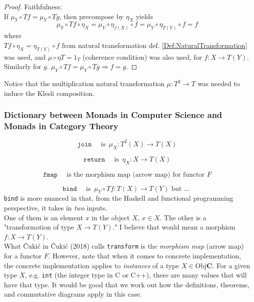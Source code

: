 \documentclass[10pt]{amsart}
\begin{document}
\begin{multicols*}{2}
\begin{proof}
Faithfulness: \\

If $\mu_Y \circ Tf = \mu_Y \circ Tg$, then precompose by $\eta_X$ yields 
\[
\mu_Y \circ Tf \circ \eta_X = \mu_Y \circ  \eta_{f(X)} \circ f = \mu_Y \circ \eta_{T(Y)} \circ f = f
\]
where \\
$Tf\circ \eta_X = \eta_{T(Y)} \circ f$ from natural transformation def. \ref{Def:NaturalTransformation} was used, and $\mu \circ \eta T = 1_T$ (coherence condition) was also used, for $f:X \to T(Y)$. \\

Similarly for $g$. $\mu_Y \circ Tf = \mu_Y \circ Tg \Longrightarrow f=g$.
\end{proof} 

Notice that the multiplication natural transformation $\mu:T^2 \to T$ was needed to induce the Klesli composition.

\subsubsection{Dictionary between Monads in Computer Science and Monads in Category Theory}

\[
\boxed{ \texttt{join} \quad \text{ is } \, \mu_X : T^2(X) \to T(X)}
\]

\[
\boxed{ \texttt{return} \quad \text{ is } \, \eta_X: X \to T(X) }
\]

\[
\boxed{ \texttt{fmap} \quad \text{ is the morphism map (arrow map) for functor } F}
\]

\[
\boxed{ \texttt{bind} \quad \text{ is } \, \mu_Y \circ Tf : T(X) \to T(Y) \text{ but ... }}
\]
\texttt{bind} is more nuanced in that, from the Haskell and functional programming perspective, it takes in \emph{two} inputs. \\

One of them is an element $x$ in the object $X$, $x \in X$. The other is a "transformation of type $X \to T(Y)$." I believe that would mean a morphism $f: X \to T(Y)$.  \\

What \v{C}uki\'{c} in \v{C}uki\'{c} (2018) \cite{Cuki2018} calls \texttt{transform} is the \emph{morphism map} (arrow map) for a functor $F$. However, note that when it comes to concrete implementation, the concrete implementation applies to \emph{instances} of a type $X \in \text{Obj}{\mathbf{C}}$. For a given type $X$, e.g. \verb|int| (the integer type in C or C++), there are many values that will have that type. It would be good that we work out how the definitions, theorems, and commutative diagrams apply in this case.


\end{multicols*}
\end{document}
